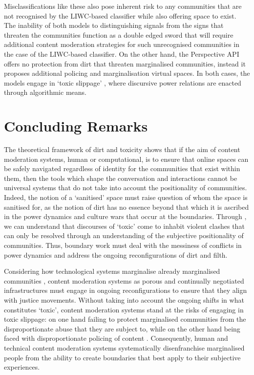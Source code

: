 Misclassifications like these also pose inherent risk to any communities that are not recognised by the LIWC-based classifier while also offering space to exist. The inability of both models to distinguishing signals from the signs that threaten the communities function as a double edged sword that will require additional content moderation strategies for such unrecognised communities in the case of the LIWC-based classifier. On the other hand, the Perspective API offers no protection from dirt that threaten marginalised communities, instead it proposes additional policing and marginalisation virtual spaces. In both cases, the models engage in `toxic slippage' \citep{Risam:2015}, where discursive power relations are enacted through algorithmic means.

\section{Concluding Remarks}

The theoretical framework of dirt and toxicity shows that if the aim of content moderation systems, human or computational, is to ensure that online spaces can be safely navigated regardless of identity for the communities that exist within them, then the tools which shape the conversation and interactions cannot be universal systems that do not take into account the positionality of communities. Indeed, the notion of a `sanitised' space must raise question of whom the space is sanitised for, as the notion of dirt has no essence beyond that which it is ascribed in the power dynamics and culture wars that occur at the boundaries. Through \citet{Risam:2015}, we can understand that discourses of `toxic' come to inhabit violent clashes that can only be resolved through an understanding of the subjective positionality of communities. Thus, boundary work must deal with the messiness of conflicts in power dynamics and address the ongoing reconfigurations of dirt and filth. 

Considering how technological systems marginalise already marginalised communities \citep{Benjamin:2019}, content moderation systems as porous and continually negotiated infrastructures must engage in ongoing reconfigurations to ensure that they align with justice movements. Without taking into account the ongoing shifts in what constitutes `toxic', content moderation systems stand at the risks of engaging in toxic slippage: on one hand failing to protect marginalised communities from the disproportionate abuse that they are subject to, while on the other hand being faced with disproportionate policing of content \citep{Schaffer:2015}. Consequently, human and technical content moderation systems systematically disenfranchise marginalised people from the ability to create boundaries that best apply to their subjective experiences.
